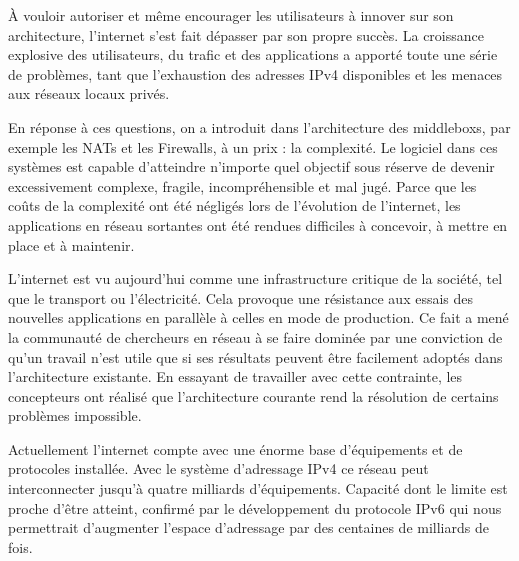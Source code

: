 À vouloir autoriser et même encourager les utilisateurs à innover sur son architecture, l'internet s'est fait dépasser par son propre succès. La croissance explosive des utilisateurs, du trafic et des applications a apporté toute une série de problèmes, 
tant que l'exhaustion des adresses IPv4 disponibles et les menaces aux réseaux locaux privés. 

\par
En réponse à ces questions, on a introduit dans l'architecture des \glspl{middlebox}, par exemple les NATs et les Firewalls, à un prix : la complexité. Le logiciel dans ces systèmes est capable d'atteindre n'importe quel objectif sous réserve de devenir excessivement complexe, fragile, incompréhensible et mal jugé. Parce que les coûts de la complexité ont été négligés lors de l'évolution de l'internet, les applications en réseau sortantes ont été rendues difficiles à concevoir, à mettre en place et à maintenir. \cite{InternetEvolutionRoleSoftwareEngineeringRealInternet}

L'internet est vu aujourd'hui comme une infrastructure critique de la société, tel que le transport ou l'électricité.  Cela provoque une résistance aux essais des nouvelles applications en parallèle à celles en mode de production. 
Ce fait a mené la communauté de chercheurs en réseau à se faire dominée par une conviction de qu'un travail n'est utile que si ses résultats peuvent être facilement adoptés dans l'architecture existante. En essayant de travailler avec cette contrainte, les concepteurs ont réalisé que l'architecture courante rend la résolution de certains problèmes impossible. \cite{OpenFlowStanfordOssification} \cite{SurveySDNIntro}

Actuellement l'internet compte avec une énorme base d'équipements et de protocoles installée. Avec le système d'adressage IPv4 ce réseau peut interconnecter jusqu'à quatre milliards d'équipements. Capacité dont le limite est proche d'être atteint, confirmé par le développement du protocole IPv6 qui nous permettrait d'augmenter l'espace d'adressage par des centaines de milliards de fois. \cite{ICANNIPv6Important} 


